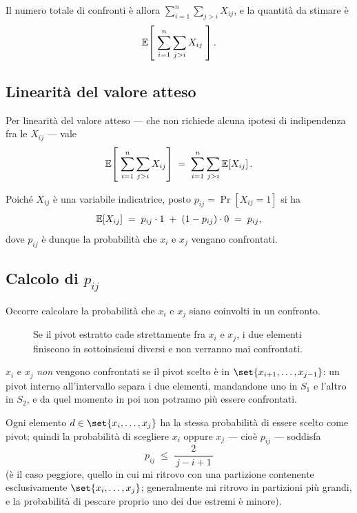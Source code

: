 Il numero totale di confronti è allora $\sum_{i=1}^{n}\sum_{j>i} X_{ij}$, e la
quantità da stimare è
\[
  \mathbb{E}\!\left[\; \sum_{i=1}^{n}\sum_{j>i} X_{ij} \;\right].
\]

\subsection{Linearità del valore atteso}
\label{sec:linearita}

Per linearità del valore atteso --- che non richiede alcuna ipotesi di
indipendenza fra le $X_{ij}$ --- vale
\[
  \mathbb{E}\!\left[\;\sum_{i=1}^{n}\sum_{j>i} X_{ij}\right]
  \;=\;
  \sum_{i=1}^{n}\sum_{j>i} \mathbb{E}\!\left[X_{ij}\right].
\]

Poiché $X_{ij}$ è una variabile indicatrice, posto
$p_{ij} = \Pr\!\left[X_{ij}=1\right]$ si ha
\[
  \mathbb{E}\!\left[X_{ij}\right] \;=\; p_{ij}\cdot 1 \;+\; (1-p_{ij})\cdot 0 \;=\; p_{ij},
\]
dove $p_{ij}$ è dunque la probabilità che $x_i$ e $x_j$ vengano confrontati.

\subsection{Calcolo di \texorpdfstring{$p_{ij}$}{p\_ij}}
\label{sec:pij}

Occorre calcolare la probabilità che $x_i$ e $x_j$ siano coinvolti in un
confronto.

\begin{figure}[H]
  \centering
  
  \caption{Se il pivot estratto cade strettamente fra $x_i$ e $x_j$, i due
  elementi finiscono in sottoinsiemi diversi e non verranno mai confrontati.}
  \label{fig:randqs-separazione}
\end{figure}

\begin{osservazione}
$x_i$ e $x_j$ \emph{non} vengono confrontati se il pivot scelto è in
$\set{x_{i+1},\dots,x_{j-1}}$: un pivot interno all'intervallo separa i due
elementi, mandandone uno in $S_1$ e l'altro in $S_2$, e da quel momento in poi
non potranno più essere confrontati.
\end{osservazione}

Ogni elemento $d \in \set{x_i,\dots,x_j}$ ha la stessa probabilità di essere
scelto come pivot; quindi la probabilità di scegliere $x_i$ oppure $x_j$ ---
cioè $p_{ij}$ --- soddisfa
\[
  p_{ij} \;\le\; \frac{2}{\,j-i+1\,}
\]
(è il caso peggiore, quello in cui mi ritrovo con una partizione contenente
esclusivamente $\set{x_i,\dots,x_j}$; generalmente mi ritrovo in partizioni più
grandi, e la probabilità di pescare proprio uno dei due estremi è minore).


